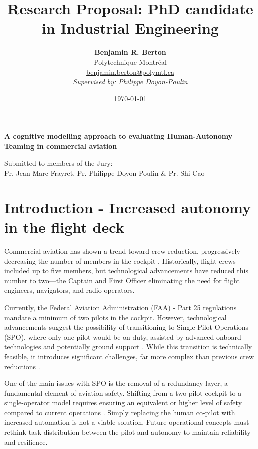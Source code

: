 \documentclass[12pt,a4paper]{article} %
\title{\textbf{Research Proposal: PhD candidate in Industrial Engineering}} %
\author{
	\textbf{Benjamin R. Berton}\\
	Polytechnique Montréal\\
	\href{mailto:benjamin.berton@polymtl.ca}{benjamin.berton@polymtl.ca}\\
	\textit{Supervised by: Philippe Doyon-Poulin}
} %
\begin{document}
	\maketitle %
	
	\begin{center}
		\textbf{A cognitive modelling approach to evaluating Human-Autonomy Teaming in commercial aviation}
	\end{center} %
	
	\begin{center}
		Submitted to members of the Jury:\\
		Pr. Jean-Marc Frayret, Pr. Philippe Doyon-Poulin \& Pr. Shi Cao\\
		\date{\today} %
	\end{center} %
	
	\newpage %
	
	\tableofcontents %
	\newpage %
	
	\section{Introduction - Increased autonomy in the flight deck} %
	Commercial aviation has shown a trend toward crew reduction, progressively decreasing the number of members in the cockpit \parencite{harris_human-centred_2007}. Historically, flight crews included up to five members, but technological advancements have reduced this number to two—the Captain and First Officer eliminating the need for flight engineers, navigators, and radio operators.
	
	Currently, the Federal Aviation Administration (FAA) - Part 25 regulations mandate a minimum of two pilots in the cockpit. However, technological advancements suggest the possibility of transitioning to Single Pilot Operations (SPO), where only one pilot would be on duty, assisted by advanced onboard technologies and potentially ground support \parencite{bilimoria_conceptual_2014}. While this transition is technically feasible, it introduces significant challenges, far more complex than previous crew reductions \parencite{matessa_using_2017}.
	
	One of the main issues with SPO is the removal of a redundancy layer, a fundamental element of aviation safety. Shifting from a two-pilot cockpit to a single-operator model requires ensuring an equivalent or higher level of safety compared to current operations \parencite{boy_requirements_2014}. Simply replacing the human co-pilot with increased automation is not a viable solution. Future operational concepts must rethink task distribution between the pilot and autonomy to maintain reliability and resilience.
	
\end{document}
